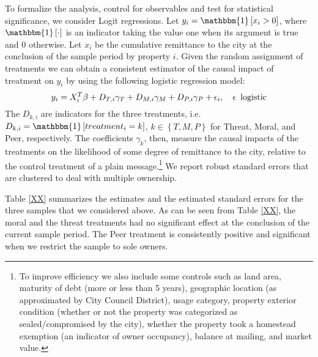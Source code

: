 \documentclass[12pt,titlepage]{article}
\begin{document}
To formalize the analysis, control for observables and test for statistical significance, we
consider Logit regressions. Let $y_{i}=\mathbbm{1}\left[x_i>0\right]$,
where $\mathbbm{1}\left[\cdot\right]$ is an indicator taking the value
one when its argument is true and 0
otherwise. Let $x_i$ be the cumulative remittance to the city at the
conclusion of the sample period by property $i$. Given the random
assignment of treatments we can obtain a consistent estimator of the
causal impact of treatment on $y_i$ by using the following logistic
regression model:
\begin{equation}
y_{i}=X_i^T\beta +D_{T,i}\gamma_{T}+D_{M,i}\gamma_{M}+D_{P,i}\gamma_{P}
+\epsilon_{i},\hspace{1em}\epsilon \enskip\mbox{logistic}
\end{equation}
The $D_{k,i}$ are indicators for the three treatments, i.e.
$D_{k,i}=\mathbbm{1}\left[treatment_i=k\right]$, $k\in\left\{T,M,P\right\}$ for
Threat, Moral, and Peer, respectively. The coefficients $\gamma_{k}$,
then, measure the causal impacts of the treatments on the likelihood
of some degree of remittance to the city, relative to the control
treatment of a plain message.\footnote{To improve efficiency we also
  include some controls such as land area, maturity of debt (more or
  less than 5 years), geographic location (as approximated by City
  Council District), usage category, property exterior condition
  (whether or not the property was categorized as sealed/compromised
  by the city), whether the property took a homestead exemption
  (an indicator of owner occupancy),
  balance at mailing, and market value.} We report robust standard
errors that are clustered to deal with multiple ownership.
  
Table \ref{XX} summarizes the estimates and the estimated standard
errors for the three samples that we considered above.
As can be seen from Table \ref{XX}, the moral and the threat
treatments had no significant effect at the conclusion of the current
sample period. The Peer treatment is consistently positive and
significant when we restrict the sample to sole owners.
  
\end{document}
